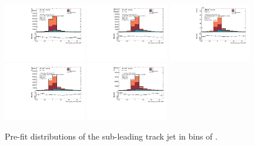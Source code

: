 \begin{figure}[htbp]
  \centering
 \includegraphics[width=0.32\textwidth]{figures/gbb/Sub_Sd0_Fits/Canv_PreFit_-3-logM_bb_over_p_TG--22_LpT_INF_SpT_INF_coarse_y.pdf}
 \includegraphics[width=0.32\textwidth]{figures/gbb/Sub_Sd0_Fits/Canv_PreFit_-22-logM_bb_over_p_TG--19_LpT_INF_SpT_INF_coarse_y.pdf}
 \includegraphics[width=0.32\textwidth]{figures/gbb/Sub_Sd0_Fits/Canv_PreFit_-19-logM_bb_over_p_TG--15_LpT_INF_SpT_INF_coarse_y.pdf}\\
 \includegraphics[width=0.32\textwidth]{figures/gbb/Sub_Sd0_Fits/Canv_PreFit_-15-logM_bb_over_p_TG--11_LpT_INF_SpT_INF_coarse_y.pdf}
 \includegraphics[width=0.32\textwidth]{figures/gbb/Sub_Sd0_Fits/Canv_PreFit_-11-logM_bb_over_p_TG-0_LpT_INF_SpT_INF_coarse_y.pdf}

\caption{Pre-fit \subsdzero distributions of the sub-leading track jet in bins of \mpt. }
  \label{fig:fracmasspt-prefits-subleading}
\end{figure}

